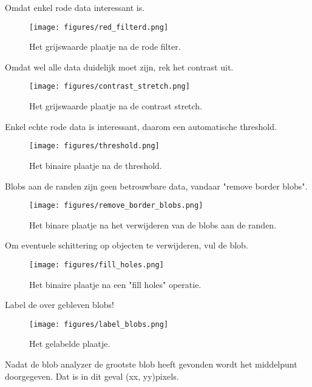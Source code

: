 Omdat enkel rode data interessant is.
\begin{figure}
    \begin{center}
        \texttt{[image: figures/red\_filterd.png]}
    \end{center}
    \caption{Het grijswaarde plaatje na de rode filter.}
    \label{fig:redFilter}
\end{figure}

Omdat wel alle data duidelijk moet zijn, rek het contrast uit.
\begin{figure}
    \begin{center}
        \texttt{[image: figures/contrast\_stretch.png]}
    \end{center}
    \caption{Het grijswaarde plaatje na de contrast stretch.}
    \label{fig:contastStretch}
\end{figure}

Enkel echte rode data is interessant, daarom een automatische threshold.
\begin{figure}
    \begin{center}
        \texttt{[image: figures/threshold.png]}
    \end{center}
    \caption{Het binaire plaatje na de threshold.}
    \label{fig:threshold}
\end{figure}

Blobs aan de randen zijn geen betrouwbare data, vandaar "remove border blobs".
\begin{figure}
    \begin{center}
        \texttt{[image: figures/remove\_border\_blobs.png]}
    \end{center}
    \caption{Het binare plaatje na het verwijderen van de blobs aan de randen.}
    \label{fig:removeBorderBlobs}
\end{figure}

Om eventuele schittering op objecten te verwijderen, vul de blob.
\begin{figure}
    \begin{center}
        \texttt{[image: figures/fill\_holes.png]}
    \end{center}
    \caption{Het binaire plaatje na een "fill holes" operatie.}
    \label{fig:fillHoles}
\end{figure}

Label de over gebleven blobs!
\begin{figure}
    \begin{center}
        \texttt{[image: figures/label\_blobs.png]}
    \end{center}
    \caption{Het gelabelde plaatje.}
    \label{fig:labelBlobs}
\end{figure}

Nadat de blob analyzer de grootste blob heeft gevonden wordt het middelpunt doorgegeven.
Dat is in dit geval (xx, yy)pixels.